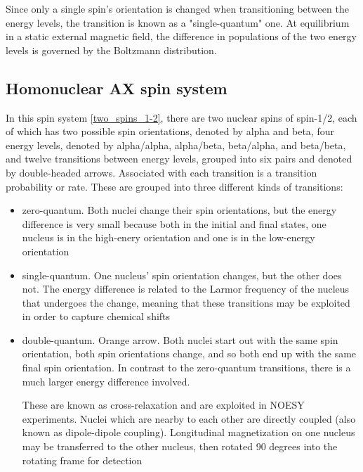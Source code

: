 Since only a single spin's orientation is changed when transitioning between
the energy levels, the transition is known as a "single-quantum" one.
At equilibrium in a static external magnetic field, the difference in 
populations of the two energy levels is governed by the Boltzmann distribution.


\subsection*{Homonuclear AX spin system}

In this spin system \ref{two_spins_1-2}, there are
two nuclear spins of spin-1/2, each of which has two possible spin orientations,
denoted by alpha and beta,
four energy levels, denoted by alpha/alpha, alpha/beta, beta/alpha, and beta/beta, and
twelve transitions between energy levels, grouped into six pairs and denoted
by double-headed arrows.  Associated with each transition is a transition
probability or rate.  These are grouped into three different kinds of transitions:

\begin{itemize} 
  \item zero-quantum.  Both nuclei change their spin orientations, 
     but the energy difference is very small because both in the initial and
     final states, one nucleus is in the high-enery orientation and one is in
     the low-energy orientation

  \item single-quantum.  One nucleus' spin orientation changes, but
     the other does not.  The energy difference is related to the Larmor frequency
     of the nucleus that undergoes the change, meaning that these transitions may
     be exploited in order to capture chemical shifts

  \item double-quantum.  Orange arrow.  Both nuclei start out with the same spin
     orientation, both spin orientations change, and so both end up with the
     same final spin orientation.  In contrast to the zero-quantum transitions,
     there is a much larger energy difference involved.

     These are known as cross-relaxation and are exploited in 
     NOESY experiments.  Nuclei which are nearby to each other are directly
     coupled (also known as dipole-dipole coupling).  Longitudinal magnetization
     on one nucleus may be transferred to the other nucleus, then rotated 90
     degrees into the rotating frame for detection
\end{itemize}
   
